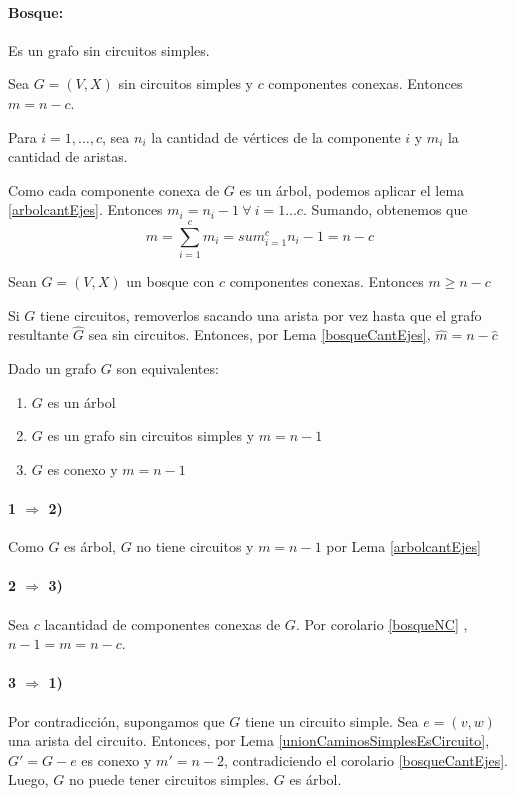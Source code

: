 \paragraph{Bosque:} Es un grafo sin circuitos simples.
\begin{coro}\label{bosqueCantEjes}
	Sea \(G = (V,X)\) sin circuitos simples y \(c\) componentes conexas. Entonces \(m = n - c\).
\end{coro}
\begin{demo}
Para \(i=1,\dots,c\), sea \(n_i\) la cantidad de vértices de la componente \(i\) y \(m_i\) la cantidad de aristas.

Como cada componente conexa de \(G\) es un árbol, podemos aplicar el lema \ref{arbolcantEjes}. Entonces \(m_i = n_i - 1~\forall~i=1\dots c\). Sumando, obtenemos que \[ m = \sum_{i=1}^{c}m_i = sum_{i=1}^{c}n_i - 1 = n - c\]
\end{demo}

\begin{coro}\label{bosqueNC}
	Sean \(G = (V, X)\) un bosque con \(c\) componentes conexas. Entonces \(m \geq n -c\)
\end{coro}
\begin{demo}
	Si \(G\) tiene circuitos, removerlos sacando una arista por vez hasta que el grafo resultante \(\hat{G}\) sea sin circuitos. Entonces, por Lema \ref{bosqueCantEjes}, \(\hat{m} = n - \hat{c}\)
\end{demo}

\begin{theorem}
	Dado un grafo \(G\) son equivalentes:
	\begin{enumerate}
		\item \(G\) es un árbol
		\item \(G\) es un grafo sin circuitos simples y \(m = n-1\)
		\item \(G\) es conexo y \(m = n - 1\)
	\end{enumerate}
\end{theorem}
\begin{demo}
	\paragraph{1 \(\Rightarrow\) 2)} Como \(G\) es árbol, \(G\) no tiene circuitos y \(m = n - 1\) por Lema \ref{arbolcantEjes}
	\paragraph{2 \(\Rightarrow\) 3)} Sea \(c\) lacantidad de componentes conexas de \(G\). Por corolario \ref{bosqueNC} , \(n - 1 = m = n - c\).
	\paragraph{3 \(\Rightarrow\)  1)} Por contradicción, supongamos que \(G\) tiene un circuito simple. Sea \(e = (v,w)\) una arista del circuito. Entonces, por Lema \ref{unionCaminosSimplesEsCircuito}, \(G' = G - e\) es conexo y \(m' = n - 2\), contradiciendo el corolario \ref{bosqueCantEjes}. Luego, \(G\) no puede tener circuitos simples. \(G\) es árbol.
\end{demo}

